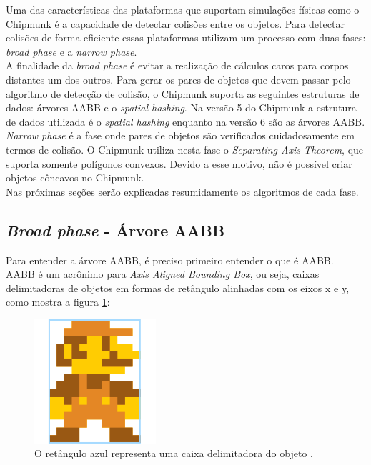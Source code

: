 Uma das características das plataformas que suportam simulações físicas como o Chipmunk é a capacidade de detectar colisões entre os objetos. 
Para detectar colisões de forma eficiente essas plataformas utilizam um processo com duas fases: \textit{broad phase} e a \textit{narrow phase}.\\

A finalidade da \textit{broad phase} é evitar a realização de cálculos caros para corpos distantes um dos outros. Para
gerar os pares de objetos que devem passar pelo algoritmo de detecção de colisão, o Chipmunk suporta as seguintes estruturas de dados:
árvores AABB e o \textit{spatial hashing}. Na versão 5 do Chipmunk a estrutura de dados utilizada é o \textit{spatial hashing} enquanto na versão 6 são as árvores AABB. \\

\textit{Narrow phase} é a fase onde pares de objetos são verificados cuidadosamente em termos de colisão. O Chipmunk utiliza nesta fase o \textit{Separating Axis Theorem}, que suporta somente polígonos convexos. Devido a esse motivo, não é possível criar objetos côncavos no Chipmunk. \\

Nas próximas seções serão explicadas resumidamente os algoritmos de cada fase.

\subsection{\textit{Broad phase} - Árvore AABB}

Para entender a árvore AABB, é preciso primeiro entender o que é AABB. AABB é um acrônimo para \textit{Axis Aligned Bounding Box}, ou seja, caixas delimitadoras de objetos 
em formas de retângulo alinhadas com os eixos x e y, como mostra a figura \ref{mariobb}:

\begin{figure}[!htbp]
  \centering
  \includegraphics[scale=0.3]{mario_bb.png} 
  \caption{O retângulo azul representa uma caixa delimitadora do objeto \protect\cite{mario:bb}.}
  \label{mariobb}
\end{figure}

